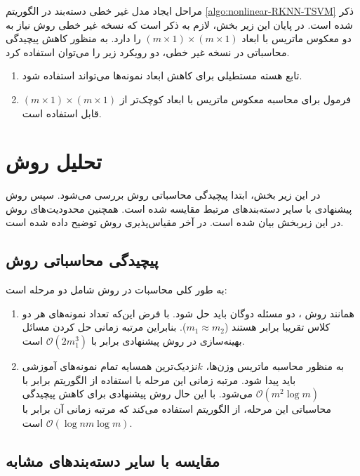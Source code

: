 مراحل ایجاد مدل غیر خطی دسته‌بند  در الگوریتم \ref{algo:nonlinear-RKNN-TSVM} ذکر شده است. در پایان این زیر بخش، لازم به ذکر است که نسخه غیر خطی روش  نیاز به دو معکوس ماتریس با ابعاد  $(m \times 1) \times (m \times 1)$ را دارد. به منظور کاهش پیچیدگی محاسباتی در نسخه غیر خطی، دو رویکرد زیر را می‌توان استفاده کرد.
\begin{enumerate}
	\item تابع هسته مستطیلی \cite{mang2001} برای کاهش ابعاد نمونه‌ها می‌تواند استفاده شود.
	\item فرمول  برای محاسبه معکوس ماتریس با ابعاد کوچک‌تر از $(m \times 1) \times (m \times 1)$  قابل استفاده است.
\end{enumerate}

\section{تحلیل روش }\label{sec:4:6}
در این زیر بخش، ابتدا پیچیدگی محاسباتی روش  بررسی می‌شود. سپس روش پیشنهادی با سایر دسته‌بندهای مرتبط مقایسه شده است. همچنین محدودیت‌های روش  در این زیربخش بیان شده است. در آخر مقیاس‌پذیری روش  توضیح داده شده است.
\subsection{پیچیدگی محاسباتی روش }\label{sec:4:6:1}
به طور کلی محاسبات در روش  شامل دو مرحله است:
\begin{enumerate}
	\item همانند روش ، دو مسئله دوگان باید حل شود. با فرض این‌که تعداد نمونه‌های هر دو کلاس تقریبا برابر هستند ($m_{1} \approx m_{2}$). بنابراین مرتبه زمانی حل کردن مسائل بهینه‌سازی در روش پیشنهادی برابر با $\mathcal{O}(2m^{3}_{1})$  است.
	\item به منظور محاسبه ماتریس وزن‌ها،   $k$نزدیک‌ترین همسایه تمام نمونه‌های آموزشی باید پیدا شود. مرتبه زمانی این مرحله با استفاده از الگوریتم  برابر با  $\mathcal{O}(m^{2}\log{m})$ می‌شود. با این حال روش پیشنهادی برای کاهش پیچیدگی محاسباتی این مرحله، از الگوریتم  استفاده می‌کند که مرتبه زمانی آن برابر با  $\mathcal{O}(\log{n}m\log{m})$ است.
\end{enumerate}

\subsection{مقایسه با سایر دسته‌بندهای مشابه}\label{sec:4:6:2}
